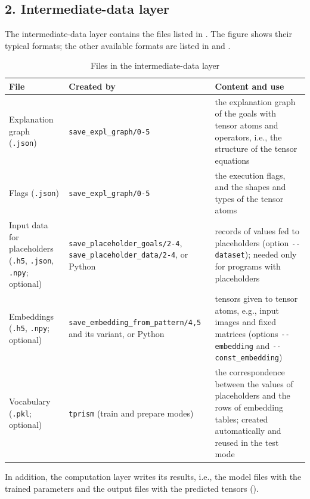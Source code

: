 \documentclass[a4paper]{report}
\begin{document}
\subsection*{2. Intermediate-data layer}
The intermediate-data layer contains the files listed in
.  The figure shows their typical formats;
the other available formats are listed in  and
.
\begin{table}[tb]
	\centering
	\small
	\begin{tabular}{P{2.7cm}P{4.6cm}P{6.6cm}}
		\toprule
		File & Created by & Content and use \\
		\midrule
		Explanation graph ({\tt .json}) & {\tt save\_expl\_graph/0-5} & the explanation graph of the goals with tensor atoms and operators, i.e., the structure of the tensor equations \\
		Flags ({\tt .json}) & {\tt save\_expl\_graph/0-5} & the execution flags, and the shapes and types of the tensor atoms \\
		Input data for placeholders ({\tt .h5}, {\tt .json}, {\tt .npy}; optional) & {\tt save\_placeholder\_goals/2-4}, {\tt save\_placeholder\_data/2-4}, or Python & records of values fed to placeholders (option {\tt -{}-dataset}); needed only for programs with placeholders \\
		Embeddings ({\tt .h5}, {\tt .npy}; optional) & {\tt save\_embedding\_\allowbreak from\_pattern/4,5} and its variant, or Python & tensors given to tensor atoms, e.g., input images and fixed matrices (options {\tt -{}-embedding} and {\tt -{}-const\_embedding}) \\
		Vocabulary ({\tt .pkl}; optional) & {\tt tprism} (train and prepare modes) & the correspondence between the values of placeholders and the rows of embedding tables; created automatically and reused in the test mode \\
		\bottomrule
	\end{tabular}
	\caption{Files in the intermediate-data layer}
	\label{tab:intermediate_files}
\end{table}
In addition, the computation layer writes its results, i.e., the model files
with the trained parameters and the output files with the predicted tensors
().
\end{document}
